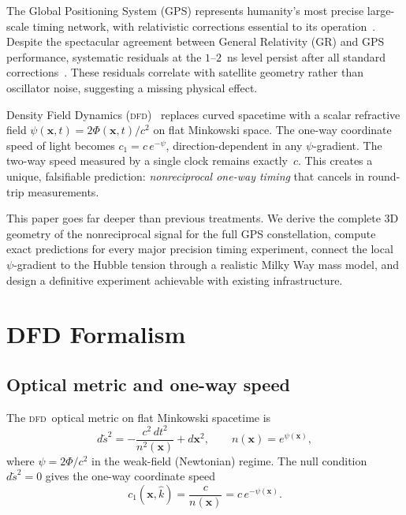 \documentclass[aps,prl,twocolumn,superscriptaddress,showpacs]{revtex4-2}
\newcommand{\DFD}{\textsc{dfd}}
\begin{document}
The Global Positioning System (GPS) represents humanity's most
precise large-scale timing network, with relativistic corrections
essential to its operation~\cite{Ashby2003}.  Despite the
spectacular agreement between General Relativity (GR) and GPS
performance, systematic residuals at the $1$--$2$~ns level persist
after all standard corrections~\cite{Senior2008,Kouba2009}.
These residuals correlate with satellite geometry rather than
oscillator noise, suggesting a missing physical effect.

Density Field Dynamics (\DFD)~\cite{AlcockDFD2025} replaces curved
spacetime with a scalar refractive field
$\psi(\mathbf{x},t) = 2\Phi(\mathbf{x},t)/c^2$ on flat Minkowski
space.  The one-way coordinate speed of light becomes
$c_1 = c\,e^{-\psi}$, direction-dependent in any $\psi$-gradient.
The two-way speed measured by a single clock remains exactly~$c$.
This creates a unique, falsifiable prediction: \emph{nonreciprocal
one-way timing} that cancels in round-trip measurements.

This paper goes far deeper than previous treatments.  We derive
the complete 3D geometry of the nonreciprocal signal for the full
GPS constellation, compute exact predictions for every major
precision timing experiment, connect the local $\psi$-gradient to
the Hubble tension through a realistic Milky Way mass model, and
design a definitive experiment achievable with existing
infrastructure.

\section{DFD Formalism}\label{sec:formalism}

\subsection{Optical metric and one-way speed}

The \DFD\ optical metric on flat Minkowski spacetime is
\begin{equation}
d\tilde{s}^2 = -\frac{c^2\,dt^2}{n^2(\mathbf{x})} + d\mathbf{x}^2,
\qquad n(\mathbf{x}) = e^{\psi(\mathbf{x})},
\label{eq:optical_metric}
\end{equation}
where $\psi = 2\Phi/c^2$ in the weak-field (Newtonian) regime.
The null condition $d\tilde{s}^2 = 0$ gives the one-way coordinate
speed
\begin{equation}
c_1(\mathbf{x},\hat{k}) = \frac{c}{n(\mathbf{x})}
= c\,e^{-\psi(\mathbf{x})}.
\label{eq:c1}
\end{equation}
\end{document}

